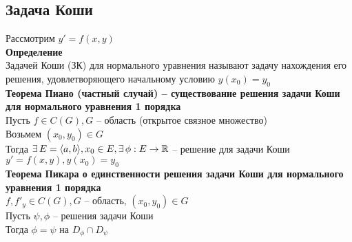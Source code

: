 \documentclass[12pt]{article}
\begin{document}
\subsection{Задача Коши}
Рассмотрим $y'=f(x,y)$\\
\textbf{Определение}\\
Задачей Коши (ЗК) для нормального уравнения называют задачу нахождения его решения, удовлетворяющего начальному условию $y(x_0) = y_0$\\
\textbf{Теорема Пиано (частный случай) -- существование решения задачи Коши для нормального уравнения 1 порядка}\\
Пусть $f \in C(G), G$ -- область (открытое связное множество)\\
Возьмем $(x_0,y_0) \in G$\\
Тогда $\exists\, E = \langle a, b \rangle, x_0 \in E, \exists\, \phi: E \rightarrow \mathbb{R}$ -- решение для задачи Коши\\
$y'=f(x,y), y(x_0) = y_0$\\
\textbf{Теорема Пикара о единственности решения задачи Коши для нормального уравнения 1 порядка}\\
$f, f'_y \in C(G), G$ -- область, $(x_0, y_0) \in G$\\
Пусть $\psi,\phi$ -- решения задачи Коши\\
Тогда $\phi = \psi$ на $D_\phi \cap D_\psi$
\end{document}

